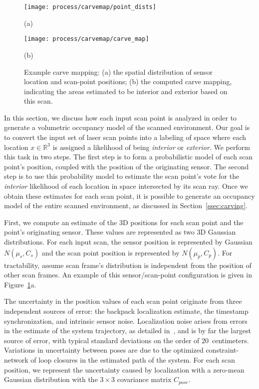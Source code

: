 \documentclass[review]{acmsiggraph}
\begin{document}
\begin{figure}[t]
	\begin{minipage}[t]{1.0\linewidth}
		\centerline{\texttt{[image: process/carvemap/point\_dists]}}
		\centerline{(a)}
	\end{minipage}
	
	\begin{minipage}[t]{1.0\linewidth}
		\centerline{\texttt{[image: process/carvemap/carve\_map]}}
		\centerline{(b)}
	\end{minipage}

	\caption{Example carve mapping: (a) the spatial distribution of sensor location and scan-point positions; (b) the computed carve mapping, indicating the areas estimated to be interior and exterior based on this scan.}
	\label{fig:carvemap}
\end{figure}

In this section, we discuss how each input scan point is analyzed in order to generate a volumetric occupancy model of the scanned environment.  Our goal is to convert the input set of laser scan points into a labeling of space where each location $x \in \mathbb{R}^3$ is assigned a likelihood of being {\it interior} or {\it exterior}.  We perform this task in two steps.  The first step is to form a probabilistic model of each scan point's position, coupled with the position of the originating sensor.  The second step is to use this probability model to estimate the scan point's vote for the {\it interior} likelihood of each location in space intersected by its scan ray.  Once we obtain these estimates for each scan point, it is possible to generate an occupancy model of the entire scanned environment, as discussed in Section~\ref{ssec:carving}.

First, we compute an estimate of the 3D positions for each scan point and the point's originating sensor.  These values are represented as two 3D Gaussian distributions.  For each input scan, the sensor position is represented by Gaussian $N(\mu_s,C_s)$ and the scan point position is represented by $N(\mu_p,C_p)$.  For tractability, assume scan frame's distribution is independent from the position of other scan frames.  An example of this sensor/scan-point configuration is given in Figure~\ref{fig:carvemap}a.

The uncertainty in the position values of each scan point originate from three independent sources of error: the backpack localization estimate, the timestamp synchronization, and intrinsic sensor noise.  Localization noise arises from errors in the estimate of the system trajectory, as detailed in~\cite{NickJournal}, and is by far the largest source of error, with typical standard deviations on the order of $20$~centimeters.  Variations in uncertainty between poses are due to the optimized constraint-network of loop closures in the estimated path of the system.  For each scan position, we represent the uncertainty caused by localization with a zero-mean Gaussian distribution with the $3 \times 3$ covariance matrix $C_{pose}$. 
\end{document}
